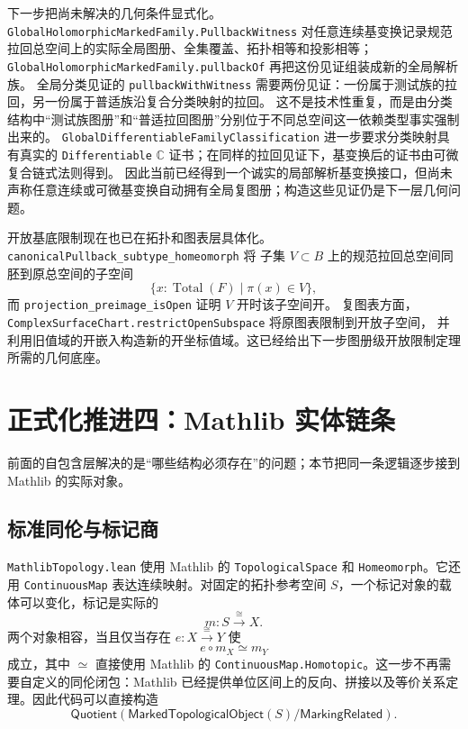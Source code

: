\documentclass[UTF8,fontset=none,a4paper,11pt]{ctexart}
\begin{document}
\par
下一步把尚未解决的几何条件显式化。
\texttt{GlobalHolomorphic\allowbreak Marked\allowbreak Family\allowbreak.Pullback\allowbreak Witness} 对任意连续基变换记录规范拉回总空间上的实际全局图册、全集覆盖、拓扑相等和投影相等；
\texttt{GlobalHolomorphic\allowbreak Marked\allowbreak Family\allowbreak.pullbackOf} 再把这份见证组装成新的全局解析族。
全局分类见证的 \texttt{pullbackWithWitness} 需要两份见证：一份属于测试族的拉回，另一份属于普适族沿复合分类映射的拉回。
这不是技术性重复，而是由分类结构中“测试族图册”和“普适拉回图册”分别位于不同总空间这一依赖类型事实强制出来的。
\texttt{GlobalDifferentiable\allowbreak Family\allowbreak Classification} 进一步要求分类映射具有真实的
\texttt{Differentiable\allowbreak} \(\mathbb C\) 证书；在同样的拉回见证下，基变换后的证书由可微复合链式法则得到。
因此当前已经得到一个诚实的局部解析基变换接口，但尚未声称任意连续或可微基变换自动拥有全局复图册；构造这些见证仍是下一层几何问题。
\par
开放基底限制现在也已在拓扑和图表层具体化。\texttt{canonicalPullback\_subtype\_homeomorph} 将
子集 \(V\subset B\) 上的规范拉回总空间同胚到原总空间的子空间
\[
  \{x:\operatorname{Total}(F)\mid \pi(x)\in V\},
\]
而 \texttt{projection\_preimage\_isOpen} 证明 \(V\) 开时该子空间开。
复图表方面，\texttt{ComplexSurfaceChart\allowbreak.restrictOpenSubspace} 将原图表限制到开放子空间，
并利用旧值域的开嵌入构造新的开坐标值域。这已经给出下一步图册级开放限制定理所需的几何底座。

\section{正式化推进四：Mathlib 实体链条}

前面的自包含层解决的是“哪些结构必须存在”的问题；本节把同一条逻辑逐步接到 Mathlib 的实际对象。

\subsection{标准同伦与标记商}

\texttt{MathlibTopology.lean} 使用 Mathlib 的 \texttt{TopologicalSpace} 和 \texttt{Homeomorph}。它还用 \texttt{ContinuousMap} 表达连续映射。对固定的拓扑参考空间 \(S\)，一个标记对象的载体可以变化，标记是实际的
\[
  m:S\xrightarrow{\cong}X.
\]
两个对象相容，当且仅当存在 \(e:X\xrightarrow{\cong}Y\) 使
\[
  e\circ m_X\simeq m_Y
\]
成立，其中 \(\simeq\) 直接使用 Mathlib 的 \texttt{ContinuousMap.Homotopic}。这一步不再需要自定义的同伦闭包：Mathlib 已经提供单位区间上的反向、拼接以及等价关系定理。因此代码可以直接构造
\[
  \mathsf{Quotient}(\mathsf{MarkedTopologicalObject}(S)/\mathsf{MarkingRelated}).
\]
\end{document}
